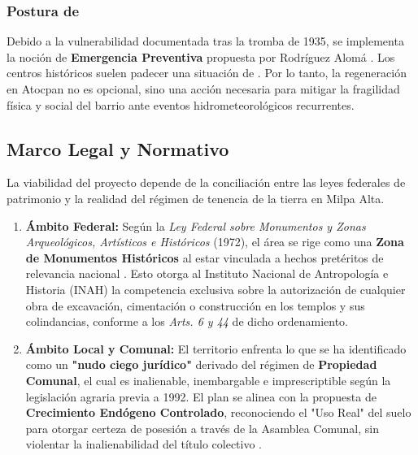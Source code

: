 \subsubsection{Postura de }
\label{ssec:emergencia-preventiva}

Debido a la vulnerabilidad documentada tras la tromba de 1935, se implementa la noción 
de \textbf{Emergencia Preventiva} propuesta por Rodríguez Alomá \cite{rodriguez2009tesis}. 
Los centros históricos suelen padecer una situación de 
. 
Por lo tanto, la regeneración en Atocpan no es opcional, sino una acción necesaria 
para mitigar la fragilidad física y social del barrio ante eventos 
hidrometeorológicos recurrentes.

\subsection{Marco Legal y Normativo}
\label{ssec:marco-legal}

La viabilidad del proyecto depende de la conciliación entre las leyes federales de 
patrimonio y la realidad del régimen de tenencia de la tierra en Milpa Alta.

\begin{enumerate}
    \item \textbf{Ámbito Federal:} Según la 
            \textit{Ley Federal sobre Monumentos y Zonas Arqueológicos, Artísticos e Históricos} 
            (1972), el área se rige como una \textbf{Zona de Monumentos Históricos} 
            al estar vinculada a hechos pretéritos de relevancia nacional 
            \citep{mexico1972ley}. Esto otorga al Instituto Nacional de 
            Antropología e Historia (INAH) la competencia exclusiva sobre la 
            autorización de cualquier obra de excavación, cimentación o construcción en 
            los templos y sus colindancias, conforme a los \textit{Arts. 6 y 44} de dicho 
            ordenamiento.

    \item \textbf{Ámbito Local y Comunal:} El territorio enfrenta lo que se ha identificado 
            como un \textbf{"nudo ciego jurídico"} derivado del régimen de 
            \textbf{Propiedad Comunal}, el cual es inalienable, inembargable e 
            imprescriptible según la legislación agraria previa a 1992. 
            El plan se alinea con la propuesta de \textbf{Crecimiento Endógeno Controlado}, 
            reconociendo el "Uso Real" del suelo para otorgar certeza de posesión a través de 
            la Asamblea Comunal, sin violentar la inalienabilidad del título colectivo \cite{lopez2017indigenas}.
\end{enumerate}

